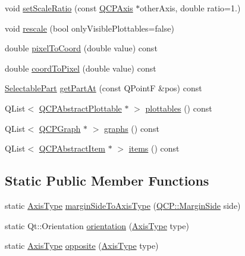 \begin{DoxyCompactItemize}
void \hyperlink{classQCPAxis_af4bbd446dcaee5a83ac30ce9bcd6e125}{set\+Scale\+Ratio} (const \hyperlink{classQCPAxis}{Q\+C\+P\+Axis} $\ast$other\+Axis, double ratio=1.)
\item 
void \hyperlink{classQCPAxis_a499345f02ebce4b23d8ccec96e58daa9}{rescale} (bool only\+Visible\+Plottables=false)
\item 
double \hyperlink{classQCPAxis_a536ef8f624cac59b6b6fdcb495723c57}{pixel\+To\+Coord} (double value) const
\item 
double \hyperlink{classQCPAxis_af15d1b3a7f7e9b53d759d3ccff1fe4b4}{coord\+To\+Pixel} (double value) const
\item 
\hyperlink{classQCPAxis_abee4c7a54c468b1385dfce2c898b115f}{Selectable\+Part} \hyperlink{classQCPAxis_a22ab2d71d7341b9b3974c0dd10619af2}{get\+Part\+At} (const Q\+PointF \&pos) const
\item 
Q\+List$<$ \hyperlink{classQCPAbstractPlottable}{Q\+C\+P\+Abstract\+Plottable} $\ast$ $>$ \hyperlink{classQCPAxis_ac5e0f6f65c75efb5fd32275d6e4ef0d6}{plottables} () const
\item 
Q\+List$<$ \hyperlink{classQCPGraph}{Q\+C\+P\+Graph} $\ast$ $>$ \hyperlink{classQCPAxis_ad590c0da223697a2727f97a520870fec}{graphs} () const
\item 
Q\+List$<$ \hyperlink{classQCPAbstractItem}{Q\+C\+P\+Abstract\+Item} $\ast$ $>$ \hyperlink{classQCPAxis_a42761bc68e2f3a9f68549d45b73f705b}{items} () const
\end{DoxyCompactItemize}
\subsection*{Static Public Member Functions}
\begin{DoxyCompactItemize}
\item 
static \hyperlink{classQCPAxis_ae2bcc1728b382f10f064612b368bc18a}{Axis\+Type} \hyperlink{classQCPAxis_ac0a6b77bd52bec6c81cd62d167cfeba6}{margin\+Side\+To\+Axis\+Type} (\hyperlink{namespaceQCP_a7e487e3e2ccb62ab7771065bab7cae54}{Q\+C\+P\+::\+Margin\+Side} side)
\item 
static Qt\+::\+Orientation \hyperlink{classQCPAxis_a9a68b3e45f1b1e33d4d807822342516c}{orientation} (\hyperlink{classQCPAxis_ae2bcc1728b382f10f064612b368bc18a}{Axis\+Type} type)
\item 
static \hyperlink{classQCPAxis_ae2bcc1728b382f10f064612b368bc18a}{Axis\+Type} \hyperlink{classQCPAxis_aa85ba73dfee6483e23825461b725e363}{opposite} (\hyperlink{classQCPAxis_ae2bcc1728b382f10f064612b368bc18a}{Axis\+Type} type)
\end{DoxyCompactItemize}
